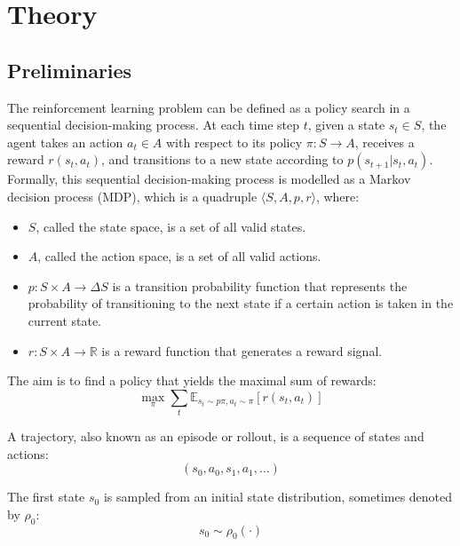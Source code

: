 \newpage
\section{Theory} \label{sec:theory}
{
\setlength{\parindent}{0pt}
\setlength{\parskip}{1.2ex}

\subsection{Preliminaries}

The reinforcement learning problem can be defined as a policy search in a sequential decision-making process. At each time step $t$, given a state $s_t \in S$, the agent takes an action $a_t \in A$ with respect to its policy $\pi \colon S \to A$, receives a reward $r(s_t, a_t)$, and transitions to a new state according to $p(s_{t+1}|s_t, a_t)$. Formally, this sequential decision-making process is modelled as a Markov decision process (MDP), which is a quadruple $\langle S, A, p, r \rangle$, where:
\begin{itemize}
\item $S$, called the state space, is a set of all valid states.
\item $A$, called the action space, is a set of all valid actions.
\item $p \colon S \times A \to \Delta S$ is a transition probability function that represents the probability of transitioning to the next state if a certain action is taken in the current state.
\item $r \colon S \times A \to \mathbb{R}$ is a reward function that generates a reward signal.
\end{itemize}

The aim is to find a policy that yields the maximal sum of rewards:
\begin{displaymath}
\max_{\pi} \sum_{t} \mathbb{E}_{s_t \sim p\pi, a_t \sim \pi} \left[ r(s_t,a_t) \right]
\end{displaymath}

A trajectory, also known as an episode or rollout, is a sequence of states and actions:
\begin{displaymath}
(s_0, a_0, s_1, a_1, \ldots)
\end{displaymath}

The first state $s_0$ is sampled from an initial state distribution, sometimes denoted by $\rho_0$:
\begin{displaymath}
s_0 \sim \rho_0(\cdot)
\end{displaymath}

}
